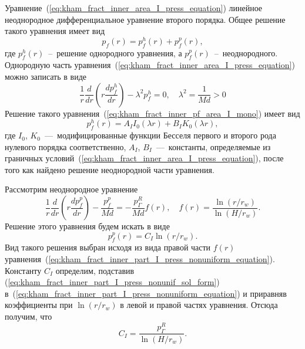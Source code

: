 \documentclass{article}
\begin{document}
Уравнение~(\ref{eq:kham_fract_inner_area_I_press_equation}) линейное неоднородное дифференциальное уравнение второго порядка.
Общее решение такого уравнения имеет вид
\begin{equation}
	\displaystyle
	p_f(r) = p_f^h\left(r\right) + p_f^p\left(r\right),
	\label{eq:kham_common_final_pf_ode_solution_view}
\end{equation}
где $p_f^h\left(r\right)$~--~решение однородного уравнения, а $p_f^p\left(r\right)$~--~неоднородного.
Однородную часть уравнения~(\ref{eq:kham_fract_inner_area_I_press_equation}) можно записать в виде
\begin{equation}
	\displaystyle
	\dfrac{1}{r}\dfrac{d}{dr}\left(r\dfrac{d p_f^h}{dr}\right) - \lambda^2 p_f^h = 0, \quad \lambda^2 = \dfrac{1}{Md} > 0
	\label{eq:kham_fract_inner_pf_area_I_mono}
\end{equation}
Решение такого уравнения~(\ref{eq:kham_fract_inner_pf_area_I_mono}) имеет вид
\begin{equation}
	\displaystyle
	p_f^h\left(r\right) = A_I I_0\left(\lambda r\right) + B_I K_0\left(\lambda r\right),
	\label{eq:kham_common_fa2_press_uniform_solution_main}
\end{equation}
где $I_0$, $K_0$~---~модифицированные функции Бесселя первого и второго рода нулевого порядка соответственно,
$A_I$, $B_I$~---~константы, определяемые из граничных условий~(\ref{eq:kham_fract_inner_area_I_press_equation}),
после того как найдено решение неоднородной части уравнения.

Рассмотрим неоднородное уравнение
\begin{equation}
	\displaystyle
	\dfrac{1}{r}\dfrac{d}{dr}\left(r\dfrac{d p_f^p}{dr}\right) - \dfrac{p_f^p}{Md} = - \dfrac{p^R_{\Gamma}}{Md}  f\left(r\right), \quad
	f\left(r\right) = \dfrac{\ln{\left(r/r_w\right)}}{\ln{\left(H/r_w\right)}}.
	\label{eq:kham_fract_inner_part_I_press_nonuniform_equation}
\end{equation}
Решение этого уравнения будем искать в виде
\begin{equation}
	\displaystyle
	p_f^p\left(r\right) = C_I \ln\left(r/r_w\right).
	\label{eq:kham_fract_inner_part_I_press_nonunif_sol_form}
\end{equation}
Вид такого решения выбран исходя из вида правой части $f\left(r\right)$ уравнения~(\ref{eq:kham_fract_inner_part_I_press_nonuniform_equation}).
Константу $C_I$ определим, подставив (\ref{eq:kham_fract_inner_part_I_press_nonunif_sol_form}) в~(\ref{eq:kham_fract_inner_part_I_press_nonuniform_equation})
и приравняв коэффициенты при $\ln\left(r/r_w\right)$ в левой и правой частях уравнения. Отсюда получим, что
\begin{equation}
	\displaystyle
	C_I = \dfrac{p^R_{\Gamma}}{\ln{\left(H/r_w\right)}}.
	\label{eq:kham_fract_inner_part_I_sol_nonunif_c_cf}
\end{equation}
\end{document}
